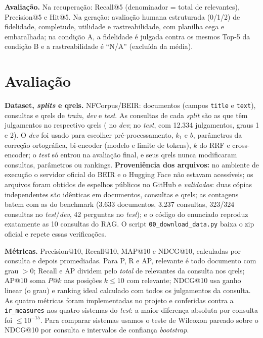 \textbf{Avaliação.} Na recuperação: Recall@5 (denominador = total de relevantes), Precision@5 e Hit@5. Na geração: avaliação humana estruturada (0/1/2) de fidelidade, completude, utilidade e rastreabilidade, com planilha cega e embaralhada; na condição A, a fidelidade é julgada contra os mesmos Top-5 da condição B e a rastreabilidade é ``N/A'' (excluída da média).

\section{Avaliação}
\textbf{Dataset, \emph{splits} e qrels.} NFCorpus/BEIR: \NDocs{} documentos (campos \texttt{title} e \texttt{text}), \NQueries{} consultas e qrels de \emph{train}, \emph{dev} e \emph{test}. As consultas de cada \emph{split} são as que têm julgamentos no respectivo qrels (\NDev{} no \emph{dev}; \NTest{} no \emph{test}, com 12.334 julgamentos, graus 1 e 2). O \emph{dev} foi usado para escolher pré-processamento, $k_1$ e $b$, parâmetros da correção ortográfica, bi-encoder (modelo e limite de tokens), $k$ do RRF e cross-encoder; o \emph{test} só entrou na avaliação final, e seus qrels nunca modificaram consultas, parâmetros ou rankings. \textbf{Proveniência dos arquivos:} no ambiente de execução o servidor oficial do BEIR e o Hugging Face não estavam acessíveis; os arquivos foram obtidos de espelhos públicos no GitHub e \emph{validados}: duas cópias independentes são idênticas em documentos, consultas e qrels; as contagens batem com as do benchmark (3.633 documentos, 3.237 consultas, 323/324 consultas no \emph{test}/\emph{dev}, 42 perguntas no \emph{test}); e o código do enunciado reproduz exatamente as 10 consultas do RAG. O script \texttt{00\_download\_data.py} baixa o zip oficial e repete essas verificações.

\textbf{Métricas.} Precision@10, Recall@10, MAP@10 e NDCG@10, calculadas por consulta e depois promediadas. Para P, R e AP, relevante é todo documento com grau $>0$; Recall e AP dividem pelo \emph{total} de relevantes da consulta nos qrels; AP@10 soma $P@k$ nas posições $k\le10$ com relevante; NDCG@10 usa ganho linear (o grau) e ranking ideal calculado com todos os julgamentos da consulta. As quatro métricas foram implementadas no projeto e conferidas contra a \texttt{ir\_measures} \cite{macavaney2022irmeasures} nos quatro sistemas do \emph{test}: a maior diferença absoluta por consulta foi $\le 10^{-15}$. Para comparar sistemas usamos o teste de Wilcoxon pareado sobre o NDCG@10 por consulta e intervalos de confiança \emph{bootstrap}.

